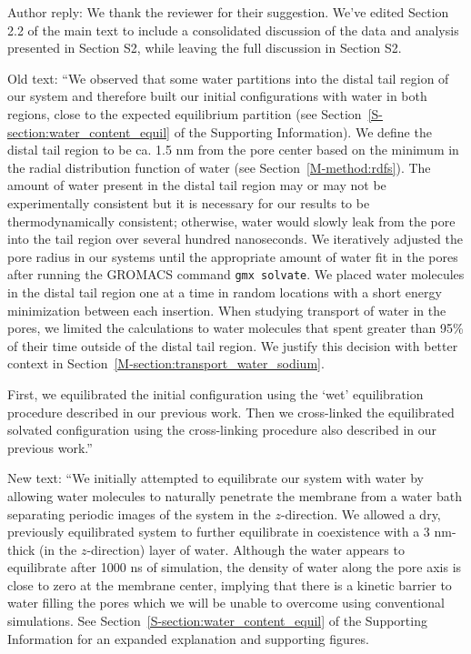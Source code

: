 \documentclass{article}
\begin{document}
\begin{enumerate}
\begin{quote}
    \end{quote}
    
    Author reply: We thank the reviewer for their suggestion. We've edited Section 2.2 of the main
    text to include a consolidated discussion of the data and analysis presented in Section S2, 
    while leaving the full discussion in Section S2.
    
    Old text: ``We observed that some water partitions into the distal tail region of our system and therefore
	built our initial configurations with water in both regions, close to the expected
	equilibrium partition (see Section~\ref{S-section:water_content_equil} of the Supporting
	Information). We define the distal tail region to be ca. 1.5 nm from the pore
	center based on the minimum in the radial distribution function of water
	(see Section~\ref{M-method:rdfs}). The amount of water present in the distal tail region
	may or may not be experimentally consistent but it is necessary for our results to be 
	thermodynamically consistent; otherwise, water would slowly leak from the pore into the
	tail region over several hundred nanoseconds. We iteratively adjusted the pore radius in our systems
	until the appropriate amount of water fit in the pores after running the GROMACS command
	\texttt{gmx solvate}. We placed water molecules in the distal tail region one at a time
	in random locations with a short energy minimization between each insertion. When 
	studying transport of water in the pores, we limited the calculations to water molecules
	that spent greater than 95\% of their time outside of the distal tail region. We 
	justify this decision with better context in Section~\ref{M-section:transport_water_sodium}.
	
    First, we equilibrated the initial configuration using the `wet' equilibration procedure 
	described in our previous work. Then we cross-linked the equilibrated solvated 
	configuration using the cross-linking procedure also described in our previous 
    work.''
           
    New text: ``We initially attempted to equilibrate our system with water by allowing water
	molecules to naturally penetrate the membrane from a water bath separating
	periodic images of the system in the $z$-direction. We allowed a dry, previously
	equilibrated system to further equilibrate in coexistence with a 3 nm-thick 
	(in the $z$-direction) layer of water. Although the water appears to equilibrate
	after 1000 ns of simulation, the density of water along the pore axis
	is close to zero at the membrane center, implying that there is a kinetic
	barrier to water filling the pores which we will be unable to overcome using
	conventional simulations. See Section~\ref{S-section:water_content_equil} 
    of the Supporting Information for an expanded explanation and supporting figures. 
	 

\end{enumerate}
\end{document}
